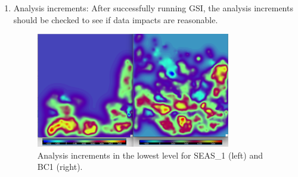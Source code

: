 \begin{enumerate}
\begin{itemize}
\begin{scriptsize}
\begin{verbatim}
pcgsoi: gnorm(1:2),b=  1.254432996913E-06  1.254434051E-06  2.97203315E-01
cost,grad,step,b,step? =   2  16  3.15885215E+03  1.12001473E-03  2.3966297E-01  2.9720331E-01  good
PCGSOI: WARNING **** Stopping inner iteration ***
gnorm  0.534787149781733860E-10 less than  0.100000004E-09
update_guess: successfully complete
\end{scriptsize}
\end{tiny}

\item Update chemical background fields:
\begin{scriptsize}
\begin{verbatim}
  ...
  k,max,min,mid var=sulf                                     38  9.1036431E-02
  4.5203370E-07  1.8112745E-02
  k,max,min,mid var=sulf                                     39  2.5694052E-02
  6.2565640E-08  5.7557132E-03
  k,max,min,mid var=sulf                                     40  1.1622031E-02
  1.4633585E-09  8.4061045E-03
  rmse_var=sulf
  ...
\end{verbatim}
\end{scriptsize}

\end{itemize}

\item Analysis increments:
After successfully running GSI, the analysis increments should be checked to see if data impacts are reasonable.
\begin{figure}[h!]
  \centering
  \includegraphics[width=0.8\textwidth]{./images/ch6_chem_inc_seas1_bc1.png}
  \caption{Analysis increments in the lowest level for SEAS\_1 (left) and BC1 (right).}
  \label{fig:chem}
\end{figure}

\end{enumerate}
